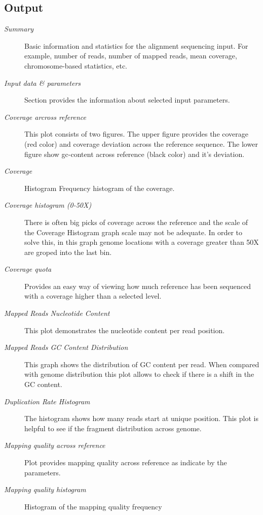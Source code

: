 \documentclass[a4paper,10pt,english]{sphinxmanual}
\begin{document}
\subsection{Output}
\label{analysis:output}\begin{description}
\item[{\emph{Summary}}] \leavevmode
Basic information and statistics for the alignment sequencing input. For example, number of reads, number of mapped reads, mean coverage, chromosome-based statistics, etc.

\item[{\emph{Input data \& parameters}}] \leavevmode
Section provides the information about selected input parameters.

\item[{\emph{Coverage arcross reference}}] \leavevmode
This plot consists of two figures. The upper figure provides the coverage (red color) and coverage deviation across the reference sequence. The lower figure show gc-content across reference (black color) and it’s deviation.

\item[{\emph{Coverage}}] \leavevmode
Histogram Frequency histogram of the coverage.

\item[{\emph{Coverage histogram (0-50X)}}] \leavevmode
There is often big picks of coverage across the reference and the scale of the Coverage Histogram graph scale may not be adequate. In order to solve this, in this graph genome locations with a coverage greater than 50X are groped into the last bin.

\item[{\emph{Coverage quota}}] \leavevmode
Provides an easy way of viewing how much reference has been sequenced with a coverage higher than a selected level.

\item[{\emph{Mapped Reads Nucleotide Content}}] \leavevmode
This plot demonstrates the nucleotide content per read position.

\item[{\emph{Mapped Reads GC Content Distribution}}] \leavevmode
This graph shows the distribution of GC content per read. When compared with genome distribution this plot allows to check if there is a shift in the GC content.

\item[{\emph{Duplication Rate Histogram}}] \leavevmode
The histogram shows how many reads start at unique position. This plot is helpful to see if the fragment distribution across genome.

\item[{\emph{Mapping quality across reference}}] \leavevmode
Plot provides mapping quality across reference as indicate by the parameters.

\item[{\emph{Mapping quality histogram}}] \leavevmode
Histogram of the mapping quality frequency

\end{description}
\end{document}
